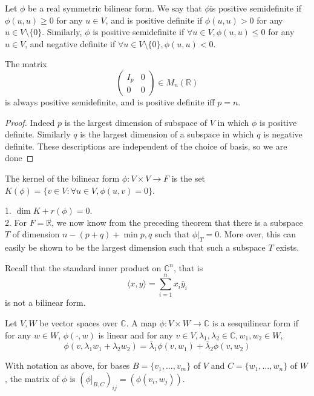 \begin{definition}
    Let $\phi$ be a real symmetric bilinear form.
    We say that $\phi$is positive semidefinite if $\phi(u,u)\ge 0$ for any $u\in V$, and is positive definite if $\phi(u,u)>0$ for any $u\in V\setminus\{0\}$.
    Similarly, $\phi$ is positive semidefinite if $\forall u\in V,\phi(u,u)\le 0$ for any $u\in V$, and negative definite if $\forall u\in V\setminus\{0\},\phi(u,u)<0$.
\end{definition}
\begin{example}
    The matrix
    $$\begin{pmatrix}
        I_p&0\\
        0&0
    \end{pmatrix}\in M_n(\mathbb R)$$
    is always positive semidefinite, and is positive definite iff $p=n$.
\end{example}
\begin{proof}
    Indeed $p$ is the largest dimension of subspace of $V$ in which $\phi$ is positive definite.
    Similarly $q$ is the largest dimension of a subspace in which $q$ is negative definite.
    These descriptions are independent of the choice of basis, so we are done
\end{proof}
\begin{definition}
    The kernel of the bilinear form $\phi:V\times V\to F$ is the set $K(\phi)=\{v\in V:\forall u\in V,\phi(u,v)=0\}$.
\end{definition}
\begin{remark}
    1. $\dim K+r(\phi)=0$.\\
    2. For $F=\mathbb R$, we now know from the preceding theorem that there is a subspace $T$ of dimension $n-(p+q)+\min{p,q}$ such that $\phi|_T=0$.
    More over, this can easily be shown to be the largest dimension such that such a subspace $T$ exists.
\end{remark}
Recall that the standard inner product on $\mathbb C^n$, that is
$$\langle x,y\rangle=\sum_{i=1}^nx_i\bar{y}_i$$
is not a bilinear form.
\begin{definition}
    Let $V,W$ be vector spaces over $\mathbb C$.
    A map $\phi:V\times W\to\mathbb C$ is a sesquilinear form if for any $w\in W$, $\phi(\cdot,w)$ is linear and for any $v\in V,\lambda_1,\lambda_2\in \mathbb C,w_1,w_2\in W$,
    $$\phi(v,\lambda_1w_1+\lambda_2w_2)=\bar{\lambda}_1\phi(v,w_1)+\bar\lambda_2\phi(v,w_2)$$
\end{definition}
\begin{definition}
    With notation as above, for bases $B=\{v_1,\ldots,v_m\}$ of $V$ and $C=\{w_1,\ldots,w_n\}$ of $W$, the matrix of $\phi$ is $(\phi]_{B,C})_{ij}=(\phi(v_i,w_j))$.
\end{definition}
